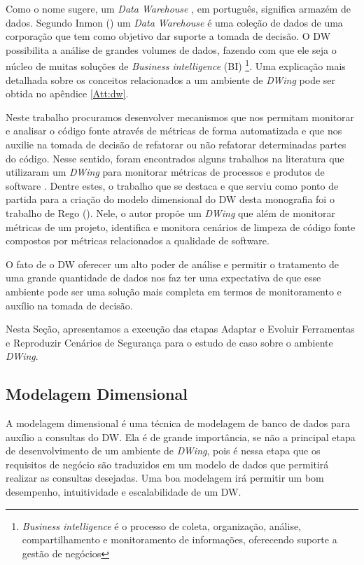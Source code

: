 Como o nome sugere, um \emph{Data Warehouse} , em português, significa armazém de dados. Segundo Inmon (\citeyear{inmon2002}) um \emph{Data Warehouse} é uma coleção de dados de uma corporação que tem como objetivo dar suporte a tomada de decisão. 
%
O DW possibilita a análise de grandes volumes de dados, fazendo com que ele seja o núcleo de muitas soluções de \emph{Business intelligence} (BI)
%
\footnote{\emph{Business intelligence} é o processo de coleta, organização, análise, compartilhamento e monitoramento de informações, oferecendo suporte a gestão de negócios}. 
%
Uma explicação mais detalhada sobre os  conceitos relacionados a um ambiente de \emph{DWing} pode ser obtida no  apêndice \ref{Att:dw}.

Neste trabalho procuramos desenvolver mecanismos que nos permitam monitorar e analisar o código fonte através de métricas de forma automatizada e que nos auxilie na tomada de decisão de refatorar ou não refatorar determinadas partes do código. 
%
Nesse sentido, foram encontrados alguns trabalhos na literatura que utilizaram um \emph{DWing} para monitorar métricas de processos e produtos de software \cite{Folleco2007} \cite{Silveira2010}\cite{mazuco2011} \cite{rego2014}. Dentre estes, o trabalho que se destaca e que serviu como ponto de partida para a criação do modelo dimensional do DW desta monografia foi o trabalho de Rego (\citeyear{rego2014}). Nele, o autor propõe um \emph{DWing} que além de monitorar métricas de um projeto,  identifica e monitora cenários de limpeza de código fonte compostos por métricas relacionados a qualidade de software.

% 
O fato de o DW oferecer um alto poder de análise e permitir o tratamento de uma grande quantidade de dados nos faz ter uma expectativa de que esse ambiente pode ser uma solução mais completa em termos de monitoramento e auxílio na tomada de decisão. 

Nesta Seção, apresentamos a execução das etapas Adaptar e Evoluir Ferramentas e Reproduzir Cenários de Segurança para o estudo de caso sobre o ambiente \emph{DWing}.

\subsection{Modelagem Dimensional}

A modelagem dimensional é uma técnica de modelagem de banco de dados para auxílio a consultas do DW. Ela é de grande importância, se não a principal etapa de desenvolvimento de um ambiente de \emph{DWing}, pois é nessa etapa que os requisitos de negócio são traduzidos em um modelo de dados que permitirá realizar as consultas desejadas. Uma boa modelagem irá permitir um bom desempenho, intuitividade e escalabilidade de um DW.

